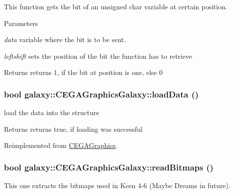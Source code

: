 This function gets the bit of an unsigned char variable at certain position. 


\begin{DoxyParams}{Parameters}
\item[{\em data}]variable where the bit is to be sent. \item[{\em leftshift}]sets the position of the bit the function has to retrieve \end{DoxyParams}
\begin{DoxyReturn}{Returns}
returns 1, if the bit at position is one, else 0 
\end{DoxyReturn}
\hypertarget{classgalaxy_1_1_c_e_g_a_graphics_galaxy_ae104cc22b636a84daca1a205277e441f}{
\subsubsection[{loadData}]{\setlength{\rightskip}{0pt plus 5cm}bool galaxy::CEGAGraphicsGalaxy::loadData ()}}
\label{classgalaxy_1_1_c_e_g_a_graphics_galaxy_ae104cc22b636a84daca1a205277e441f}


load the data into the structure 

\begin{DoxyReturn}{Returns}
returns true, if loading was successful 
\end{DoxyReturn}


Reimplemented from \hyperlink{class_c_e_g_a_graphics}{CEGAGraphics}.

\hypertarget{classgalaxy_1_1_c_e_g_a_graphics_galaxy_abbc3e13228b0c108739ce838e2be4385}{
\subsubsection[{readBitmaps}]{\setlength{\rightskip}{0pt plus 5cm}bool galaxy::CEGAGraphicsGalaxy::readBitmaps ()}}
\label{classgalaxy_1_1_c_e_g_a_graphics_galaxy_abbc3e13228b0c108739ce838e2be4385}


This one extracts the bitmaps used in Keen 4-\/6 (Maybe Dreams in future). 

